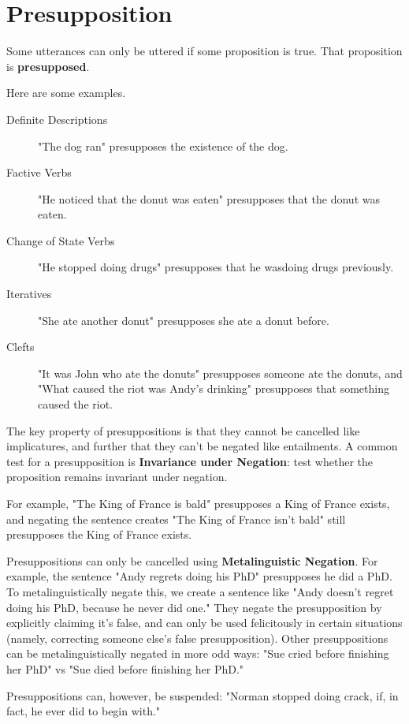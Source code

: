 \documentclass[11pt]{article}
\begin{document}
\section{Presupposition}

Some utterances can only be uttered if some proposition is true. That proposition is \textbf{presupposed}.

Here are some examples.

\begin{description}
    \item[Definite Descriptions] "The dog ran" presupposes the existence of the dog.
    \item[Factive Verbs] "He noticed that the donut was eaten" presupposes that the donut was eaten.
    \item[Change of State Verbs] "He stopped doing drugs" presupposes that he wasdoing drugs previously.
    \item[Iteratives] "She ate another donut" presupposes she ate a donut before.
    \item[Clefts] "It was John who ate the donuts" presupposes someone ate the donuts, and "What caused
        the riot was Andy's drinking" presupposes that something caused the riot.
\end{description}

The key property of presuppositions is that they cannot be cancelled like implicatures, and further that
they can't be negated like entailments. A common test for a presupposition is \textbf{Invariance under 
Negation}: test whether the proposition remains invariant under negation.

For example, "The King of France is bald" presupposes a King of France exists, and negating the sentence creates
"The King of France isn't bald" still presupposes the King of France exists. 

Presuppositions can only be cancelled using \textbf{Metalinguistic Negation}. For example, the sentence 
"Andy regrets doing his PhD" presupposes he did a PhD. To metalinguistically negate this, we create a
sentence like "Andy doesn't regret doing his PhD, because he never did one." They negate the presupposition
by explicitly claiming it's false, and can only be used felicitously in certain situations (namely, 
correcting someone else's false presupposition). Other presuppositions can be metalinguistically negated
in more odd ways: "Sue cried before finishing her PhD" vs "Sue died before finishing her PhD."

Presuppositions can, however, be suspended: "Norman stopped doing crack, if, in fact, he ever did to begin
with."
\end{document}

